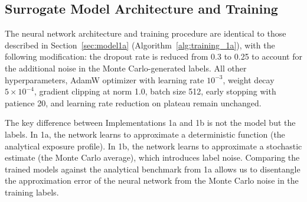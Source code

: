  \subsection{Surrogate Model Architecture and Training}

  The neural network architecture and training procedure are identical to those described in Section~\ref{sec:model1a} (Algorithm~\ref{alg:training_1a}), with the following modification: the
   dropout rate is reduced from 0.3 to 0.25 to account for the additional noise in the Monte Carlo-generated labels. All other hyperparameters, AdamW optimizer with learning rate
  $10^{-3}$, weight decay $5 \times 10^{-4}$, gradient clipping at norm 1.0, batch size 512, early stopping with patience 20, and learning rate reduction on plateau remain unchanged.

  The key difference between Implementations 1a and 1b is not the model but the labels. In 1a, the network learns to approximate a deterministic function (the analytical exposure profile).
  In 1b, the network learns to approximate a stochastic estimate (the Monte Carlo average), which introduces label noise. Comparing the trained models against the analytical benchmark from
  1a allows us to disentangle the approximation error of the neural network from the Monte Carlo noise in the training labels.
